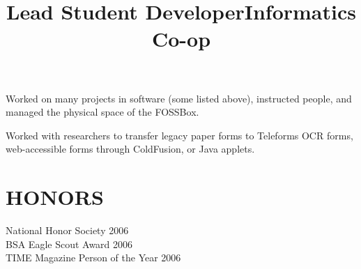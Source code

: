 \documentclass[line]{res}
\begin{document}
\begin{resume}
    \title{Lead Student Developer}
    \begin{position}
        Worked on many projects in software (some listed above), instructed
        people, and managed the physical space of the FOSSBox.
    \end{position}

    \title{Informatics Co-op}
    \begin{position}
        Worked with researchers to transfer legacy paper forms to Teleforms OCR
        forms, web-accessible forms through ColdFusion, or Java applets.
    \end{position}

\section{HONORS}
    National Honor Society 2006 \\
    BSA Eagle Scout Award 2006 \\
    TIME Magazine Person of the Year 2006

\end{resume}
\end{document}
